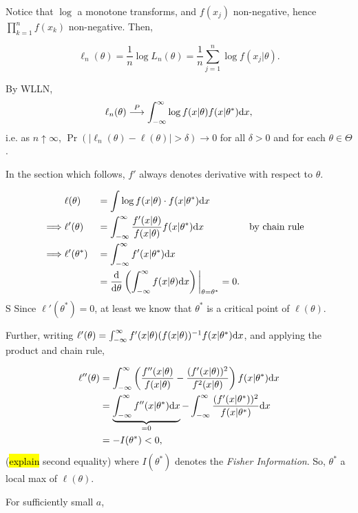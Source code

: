 \documentclass[12pt]{article}\usepackage[]{graphicx}\usepackage[]{color}
\begin{document}
Notice that $\log$ a monotone transforms, and $f(x_j)$ non-negative,
hence $\prod_{k=1}^n f(x_k)$ non-negative. Then,

\[
\ell_n(\theta) = \frac{1}{n} \log L_n (\theta) = \frac{1}{n} \sum_{j=1}^n \log f(x_j|\theta).
\]

By WLLN,
\[
\ell_n(\theta) \overset{P}{\longrightarrow} \int_{-\infty}^\infty \log f(x|\theta) f(x|\theta^*) \mathrm{d} x,
\]
i.e. as $n \uparrow \infty$, $\Pr(|\ell_n (\theta) - \ell(\theta)| > \delta) \longrightarrow 0$ for all $\delta > 0$ and for each $\theta \in \Theta$.

In the section which follows, $f'$ always denotes derivative with 
respect to $\theta$.

\begin{alignat*}{5}
&\ell(\theta) &&= \int \log f(x|\theta) \cdot f(x|\theta^*) \mathrm{d} x \\
\implies &\ell '(\theta) &&= \int_{-\infty}^\infty \frac{f'(x|\theta)}{f(x|\theta)} f(x|\theta^*) \mathrm{d} x &&\textrm{by chain rule} \\
\implies &\ell '(\theta^*) &&= \int_{-\infty}^\infty f'(x|\theta^*) \mathrm{d} x \\
&                 &&= \frac{\mathrm{d}}{\mathrm{d} \theta} \left( \int_{-\infty}^\infty f(x|\theta) \mathrm{d} x \right) \bigg|_{\theta = \theta^*} = 0. \end{alignat*}
S
Since $\ell'(\theta^*) = 0$, at least we know that $\theta^*$ is a 
critical point of $\ell(\theta)$.

Further, writing $\ell'(\theta) = \int_{-\infty}^\infty f'(x|\theta) (f(x|\theta))^{-1} f(x|\theta^*) \mathrm{d} x$, and applying the product and chain rule,

\begin{align*}   \ell ''(\theta) &= \int_{-\infty}^\infty \left( \frac{f''(x|\theta)}{f(x|\theta)} - \frac{(f'(x|\theta))^2}{f^2(x|\theta)} \right) f(x|\theta^*) \mathrm{d} x \\
                 &= \underbrace{ \int_{-\infty}^\infty f''(x|\theta^*) \mathrm{d} x}_{=0} - \int_{-\infty}^\infty \frac{(f'(x|\theta^*))^2}{f(x|\theta^*)} \mathrm{d} x\\
                 &= -I(\theta^*) < 0, \end{align*}
(\hl{explain} second equality)
where $I(\theta^*)$ denotes the \emph{Fisher Information}. So,
$\theta^*$ a local max of $\ell (\theta)$.

For sufficiently small $a$,
\end{document}
